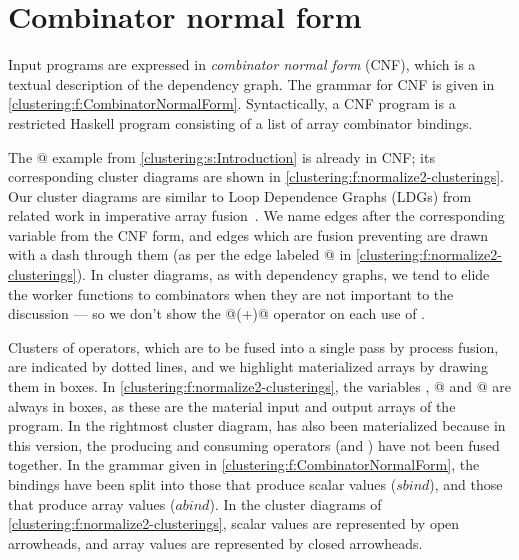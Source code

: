 

\section{Combinator normal form}
\label{clustering:s:CombinatorNormalForm}
Input programs are expressed in \emph{combinator normal form} (CNF), which is a textual description of the dependency graph.
The grammar for CNF is given in \cref{clustering:f:CombinatorNormalForm}.
Syntactically, a CNF program is a restricted Haskell program consisting of a list of array combinator bindings.



The @ example from \cref{clustering:s:Introduction} is already in CNF;
its corresponding cluster diagrams are shown in \cref{clustering:f:normalize2-clusterings}.
Our cluster diagrams are similar to Loop Dependence Graphs (LDGs) from related work in imperative array fusion~\cite{gao1993collective}.
We name edges after the corresponding variable from the CNF form, and edges which are fusion preventing are drawn with a dash through them (as per the edge labeled @ in \cref{clustering:f:normalize2-clusterings}).
In cluster diagrams, as with dependency graphs, we tend to elide the worker functions to combinators when they are not important to the discussion --- so we don't show the @(+)@ operator on each use of \Hs@fold@.


Clusters of operators, which are to be fused into a single pass by process fusion, are indicated by dotted lines, and we highlight materialized arrays by drawing them in boxes.
In \cref{clustering:f:normalize2-clusterings}, the variables \Hs@xs@, @ and @ are always in boxes, as these are the material input and output arrays of the program.
In the rightmost cluster diagram, \Hs@gts@ has also been materialized because in this version, the producing and consuming operators (\Hs@filter@ and \Hs@fold@) have not been fused together.
In the grammar given in \cref{clustering:f:CombinatorNormalForm}, the bindings have been split into those that produce scalar values ($sbind$), and those that produce array values ($abind$).
In the cluster diagrams of \cref{clustering:f:normalize2-clusterings}, scalar values are represented by open arrowheads, and array values are represented by closed arrowheads.

